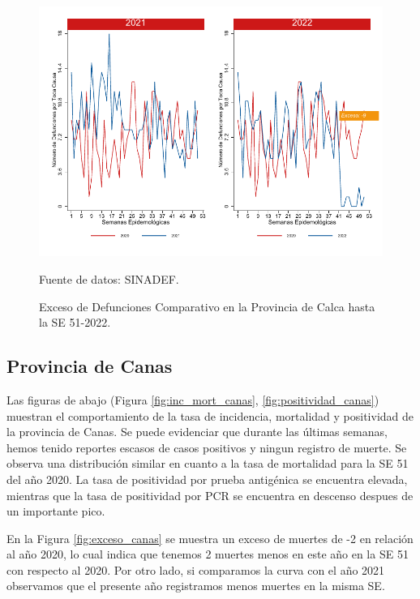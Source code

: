 \documentclass[12pt,a4paper,openany]{book}
\begin{document}
	\begin{figure}[h]
		\caption{Exceso de Defunciones Comparativo en la Provincia de Calca hasta la SE 51-2022.}\label{fig:exceso_calca}
		\begin{center}
			\includegraphics[width=0.7\linewidth]{../figuras/exceso_3.pdf}
		\end{center}
		{\footnotesize {Fuente de datos: SINADEF.}}
	\end{figure}
	
	\clearpage
	
	\subsection*{Provincia de Canas}
	\noindent Las figuras de abajo (Figura \ref{fig:inc_mort_canas}, \ref{fig:positividad_canas}) muestran el comportamiento de la tasa de incidencia, mortalidad y  positividad de  la provincia de Canas. Se puede evidenciar que durante las últimas semanas, hemos tenido reportes escasos de casos positivos y ningun registro de muerte. Se observa una distribución similar en cuanto a la tasa de mortalidad para la SE 51 del año 2020. La tasa de positividad por prueba antigénica se encuentra elevada, mientras que la tasa de positividad por PCR se encuentra en descenso despues de un importante pico.

	
	En la Figura \ref{fig:exceso_canas} se muestra un exceso de muertes de -2 en relación al año 2020, lo cual indica que tenemos 2 muertes menos en este año en la SE 51 con respecto al 2020. Por otro lado, si comparamos la curva con el año 2021 observamos que el presente año registramos menos muertes en la misma SE.
	
\end{document}
